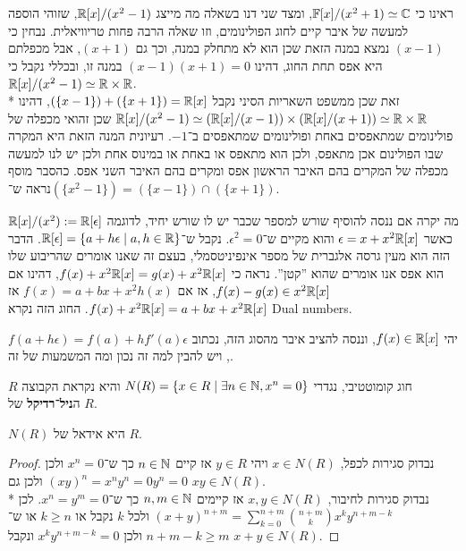 \begin{example}
	ראינו כי $\mathbb{F}[x] / (x^2 + 1) \simeq \mathbb{C}$, ומצד שני דנו בשאלה מה מייצג $\mathbb{R}[x] / (x^2 - 1)$, שזוהי הוספה למעשה של איבר קיים לחוג הפולינומים, וזו שאלה הרבה פחות טריוויאלית.
	נבחין כי $(x - 1)$ נמצא במנה הזאת שכן הוא לא מתחלק במנה, וכך גם $(x + 1)$, אבל מכפלתם היא אפס תחת החוג, דהינו $(x - 1)(x + 1) = 0$ במנה זו, ובכללי נקבל כי $\mathbb{R}[x] / (x^2 - 1) \simeq \mathbb{R} \times \mathbb{R}$. \\*
	זאת שכן ממשפט השאריות הסיני נקבל $(\{x - 1\}) + (\{x + 1\}) = \mathbb{R}[x]$,
	דהינו $\mathbb{R}[x] / (x^2 - 1) \simeq (\mathbb{R}[x]/(x - 1)) \times (\mathbb{R}[x]/(x + 1)) \simeq \mathbb{R} \times \mathbb{R}$ שכן זהואי מכפלה של פולינומים שמתאפסים באחת ופולינומים שמתאפסים ב־$-1$.
	רעיונית המנה הזאת היא המקרה שבו הפולינום אכן מתאפס, ולכן הוא מתאפס או באחת או במינוס אחת ולכן יש לנו למעשה מכפלה של המקרים בהם האיבר הראשון אפס ומקרים בהם האיבר השני אפס.
	כהסבר מוסף נראה ש־$(\{x^2 - 1\}) = (\{x - 1\}) \cap (\{x + 1\})$.
\end{example}
מה יקרה אם ננסה להוסיף שורש למספר שכבר יש לו שורש יחיד, לדוגמה $\mathbb{R}[x] / (x^2) := \mathbb{R}[\epsilon]$ כאשר $\epsilon = x + x^2 \mathbb{R}[x]$ והוא מקיים ש־$\epsilon^2 = 0$.
נקבל ש־$\mathbb{R}[\epsilon] = \{ a + h\epsilon \mid a, h \in \mathbb{R} \}$. הדבר הזה הוא מעין גרסה אלגברית של מספר אינפיניטסמלי, בעצם זה שאנו אומרים שהריבוע שלו הוא אפס אנו אומרים שהוא ''קטן''.
נראה כי $f(x) + x^2 \mathbb{R}[x] = g(x) + x^2 \mathbb{R}[x]$, דהינו אם $f(x) - g(x) \in x^2 \mathbb{R}[x]$, אז אם $f(x) = a + bx + x^2 h(x)$ אז $f(x) + x^2 \mathbb{R}[x] = a + bx + x^2 \mathbb{R}[x]$.
החוג הזה נקרא Dual numbers.
\begin{exercise}
	יהי $f(x) \in \mathbb{R}[x]$, וננסה להציב איבר מהסוג הזה, נכתוב $f(a + h\epsilon) = f(a) + h f'(a) \epsilon$, ויש להבין למה זה נכון ומה המשמעות של זה.
\end{exercise}
\begin{definition}
	$R$ חוג קומוטטיבי, נגדרי $N(R) = \{ x \in R \mid \exists n \in \mathbb{N}, x^n = 0 \}$ והיא נקראת הקבוצה ה\textbf{ניל־רדיקל} של $R$.
\end{definition}
\begin{proposition}
	$N(R)$ היא אידאל של $R$.
\end{proposition}
\begin{proof}
	נבדוק סגירות לכפל, $x \in N(R)$ ויהי $y \in R$ אז קיים $n \in \mathbb{N}$ כך ש־$x^n = 0$ ולכן ${(xy)}^n = x^n y^n = 0 y^n = 0$ ולכן גם $xy \in N(R)$. \\*
	נבדוק סגירות לחיבור, $x, y \in N(R)$ אז קיימים $n, m \in \mathbb{N}$ כך ש־$x^n = y^m = 0$.
	לכן ${(x + y)}^{n + m} = \sum_{k = 0}^{n + m} \binom{n + m}{k} x^k y^{n + m - k}$ ולכל $k$ נקבל או $k \ge n$ או ש־$n + m - k \ge m$ ולכן $x^k y^{n + m - k} = 0$ ונקבל $x + y \in N(R)$.
\end{proof}
